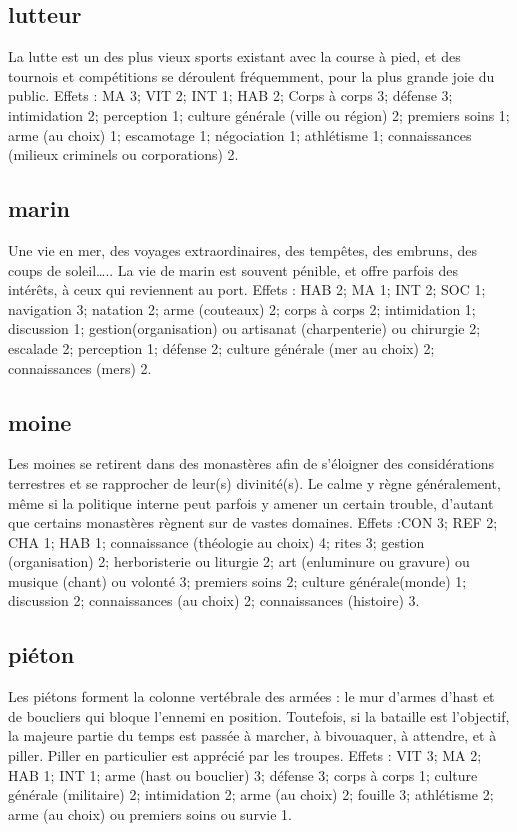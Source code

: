 \documentclass[10pt,a4paper,twocolumn]{book}
\begin{document}
\subsection*{lutteur}
La lutte est un des plus vieux sports existant avec la course à pied, et des tournois et compétitions se déroulent fréquemment, pour la plus grande joie du public.
Effets : MA 3; VIT 2; INT 1; HAB 2; Corps à corps 3; défense 3; intimidation 2; perception 1; culture générale (ville ou région) 2; premiers soins 1; arme (au choix) 1; escamotage 1; négociation 1; athlétisme 1; connaissances (milieux criminels ou corporations) 2.

\subsection*{marin}
Une vie en mer, des voyages extraordinaires, des tempêtes, des embruns, des coups de soleil….. La vie de marin est souvent pénible, et offre parfois des intérêts, à ceux qui reviennent au port.
Effets : HAB 2; MA 1; INT 2; SOC 1; navigation 3; natation 2; arme (couteaux) 2; corps à corps 2; intimidation 1; discussion 1; gestion(organisation) ou artisanat (charpenterie) ou chirurgie 2; escalade 2; perception 1; défense 2; culture générale (mer au choix) 2; connaissances (mers) 2.
\subsection*{moine}
Les moines se retirent dans des monastères afin de s’éloigner des considérations terrestres et se rapprocher de leur(s) divinité(s). Le calme y règne généralement, même si la politique interne peut parfois y amener un certain trouble, d’autant que certains monastères règnent sur de vastes domaines.
Effets :CON 3; REF 2; CHA 1; HAB 1; connaissance (théologie au choix) 4;  rites 3; gestion (organisation) 2; herboristerie ou liturgie 2; art (enluminure ou gravure) ou musique (chant) ou volonté 3; premiers soins 2; culture générale(monde) 1; discussion 2; connaissances (au choix) 2; connaissances (histoire) 3.
\subsection*{piéton}
Les piétons forment la colonne vertébrale des armées : le mur d’armes d’hast et de boucliers qui bloque l’ennemi en position. Toutefois, si la bataille est l’objectif, la majeure partie du temps est passée à marcher, à bivouaquer, à attendre, et à piller. Piller en particulier est apprécié par les troupes.
Effets : VIT 3; MA 2; HAB 1; INT 1; arme (hast ou bouclier) 3; défense 3; corps à corps 1; culture générale (militaire) 2; intimidation 2; arme (au choix) 2; fouille 3; athlétisme 2; arme (au choix) ou premiers soins ou survie 1.
\end{document}
